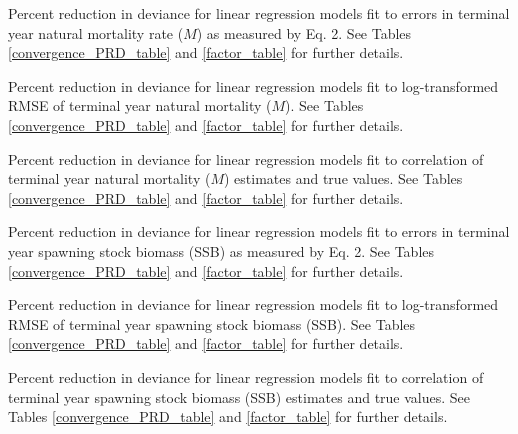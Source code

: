 \documentclass[
  12pt,
]{article}
\begin{document}
\begin{table}
\caption{Percent reduction in deviance for linear regression models fit to errors in terminal year natural mortality rate ($M$) as measured by Eq. 2. See Tables \ref{convergence_PRD_table} and \ref{factor_table} for further details.}\label{bias_M_PRD_table}
{}
\end{table}
\pagebreak

\begin{table}
\caption{Percent reduction in deviance for linear regression models fit to log-transformed RMSE of terminal year natural mortality ($M$). See Tables \ref{convergence_PRD_table} and \ref{factor_table} for further details.}\label{rmse_M_PRD_table}
{}
\end{table}
\pagebreak

\begin{table}
\caption{Percent reduction in deviance for linear regression models fit to correlation of terminal year natural mortality ($M$) estimates and true values. See Tables \ref{convergence_PRD_table} and \ref{factor_table} for further details.}\label{corr_M_PRD_table}
{}
\end{table}
\pagebreak

\begin{table}
\caption{Percent reduction in deviance for linear regression models fit to errors in terminal year spawning stock biomass (SSB) as measured by Eq. 2. See Tables \ref{convergence_PRD_table} and \ref{factor_table} for further details.}\label{bias_SSB_PRD_table}
{}
\end{table}
\pagebreak

\begin{table}
\caption{Percent reduction in deviance for linear regression models fit to log-transformed RMSE of terminal year spawning stock biomass (SSB). See Tables \ref{convergence_PRD_table} and \ref{factor_table} for further details.}\label{rmse_SSB_PRD_table}
{}
\end{table}
\pagebreak

\begin{table}
\caption{Percent reduction in deviance for linear regression models fit to correlation of terminal year spawning stock biomass (SSB) estimates and true values. See Tables \ref{convergence_PRD_table} and \ref{factor_table} for further details.}\label{corr_ssb_PRD_table}
{}
\end{table}
\pagebreak
\end{document}
